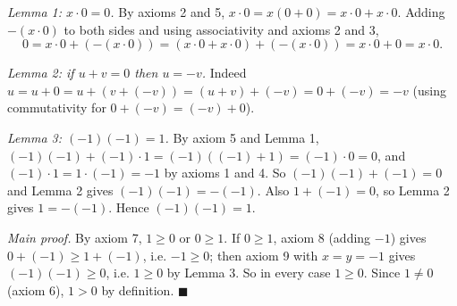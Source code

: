 \emph{Lemma 1: $x\cdot0=0$.} By axioms 2 and 5, $x\cdot0=x(0+0)=x\cdot0+x\cdot0$. Adding $-(x\cdot0)$ to both sides and using associativity and axioms 2 and 3,
\[0=x\cdot0+\left(-(x\cdot0)\right)=\left(x\cdot0+x\cdot0\right)+\left(-(x\cdot0)\right)=x\cdot0+0=x\cdot0.\]

\emph{Lemma 2: if $u+v=0$ then $u=-v$.} Indeed $u=u+0=u+\left(v+(-v)\right)=(u+v)+(-v)=0+(-v)=-v$ (using commutativity for $0+(-v)=(-v)+0$).

\emph{Lemma 3: $(-1)(-1)=1$.} By axiom 5 and Lemma 1, $(-1)(-1)+(-1)\cdot1=(-1)\left((-1)+1\right)=(-1)\cdot0=0$, and $(-1)\cdot1=1\cdot(-1)=-1$ by axioms 1 and 4. So $(-1)(-1)+(-1)=0$ and Lemma 2 gives $(-1)(-1)=-(-1)$. Also $1+(-1)=0$, so Lemma 2 gives $1=-(-1)$. Hence $(-1)(-1)=1$.

\emph{Main proof.} By axiom 7, $1\ge0$ or $0\ge1$. If $0\ge1$, axiom 8 (adding $-1$) gives $0+(-1)\ge1+(-1)$, i.e. $-1\ge0$; then axiom 9 with $x=y=-1$ gives $(-1)(-1)\ge0$, i.e. $1\ge0$ by Lemma 3. So in every case $1\ge0$. Since $1\ne0$ (axiom 6), $1>0$ by definition. $\blacksquare$
